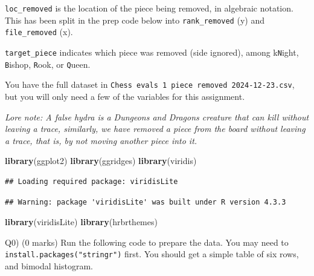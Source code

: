 \documentclass[
]{article}
\newenvironment{Shaded}{\begin{snugshade}}{\end{snugshade}}
\newcommand{\FunctionTok}[1]{\textcolor[rgb]{0.13,0.29,0.53}{\textbf{#1}}}
\newcommand{\NormalTok}[1]{#1}
\begin{document}
\texttt{loc\_removed} is the location of the piece being removed, in
algebraic notation. This has been split in the prep code below into
\texttt{rank\_removed} (y) and \texttt{file\_removed} (x).

\texttt{target\_piece} indicates which piece was removed (side ignored),
among k\texttt{N}ight, \texttt{B}ishop, \texttt{R}ook, or
\texttt{Q}ueen.

You have the full dataset in
\texttt{Chess\ evals\ 1\ piece\ removed\ 2024-12-23.csv}, but you will
only need a few of the variables for this assignment.

\emph{Lore note: A false hydra is a Dungeons and Dragons creature that
can kill without leaving a trace, similarly, we have removed a piece
from the board without leaving a trace, that is, by not moving another
piece into it.}

\begin{Shaded}
\begin{Highlighting}[]
\FunctionTok{library}\NormalTok{(ggplot2)}
\FunctionTok{library}\NormalTok{(ggridges)}
\FunctionTok{library}\NormalTok{(viridis)}
\end{Highlighting}
\end{Shaded}

\begin{verbatim}
## Loading required package: viridisLite
\end{verbatim}

\begin{verbatim}
## Warning: package 'viridisLite' was built under R version 4.3.3
\end{verbatim}

\begin{Shaded}
\begin{Highlighting}[]
\FunctionTok{library}\NormalTok{(viridisLite)}
\FunctionTok{library}\NormalTok{(hrbrthemes)}
\end{Highlighting}
\end{Shaded}

Q0) (0 marks) Run the following code to prepare the data. You may need
to \texttt{install.packages("stringr")} first. You should get a simple
table of six rows, and bimodal histogram.
\end{document}
